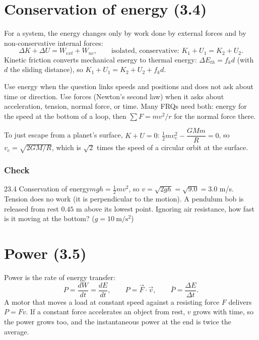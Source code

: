 \documentclass[11pt]{article}
\begin{document}
\section{Conservation of energy (3.4)}\label{sec:3}

For a system, the energy changes only by work done by external forces and by non-conservative internal forces:
\[ \Delta K + \Delta U = W_{ext} + W_{nc}, \qquad \text{isolated, conservative: } K_1 + U_1 = K_2 + U_2. \]
Kinetic friction converts mechanical energy to thermal energy: $\Delta E_{th} = f_k d$ (with $d$ the sliding distance), so $K_1 + U_1 = K_2 + U_2 + f_k d$.

\begin{keyidea}
Use energy when the question links speeds and positions and does not ask about time or direction. Use forces (Newton's second law) when it asks about acceleration, tension, normal force, or time. Many FRQs need both: energy for the speed at the bottom of a loop, then $\sum F = mv^2/r$ for the normal force there.
\end{keyidea}

\begin{example}
To just escape from a planet's surface, $K + U = 0$: $\tfrac12 mv_e^2 - \dfrac{GMm}{R} = 0$, so $v_e = \sqrt{2GM/R}$, which is $\sqrt2$ times the speed of a circular orbit at the surface.
\end{example}

\subsubsection{Check}\mbox{}

\begin{q}{2}{3.4 Conservation of energy}{$mgh = \tfrac12 mv^2$, so $v = \sqrt{2gh} = \sqrt{9.0} = 3.0$ m/s. Tension does no work (it is perpendicular to the motion).}
A pendulum bob is released from rest $0.45$ m above its lowest point. Ignoring air resistance, how fast is it moving at the bottom? ($g = 10\ \mathrm{m/s^2}$)
\end{q}

\section{Power (3.5)}\label{sec:4}

Power is the rate of energy transfer:
\[ P = \frac{dW}{dt} = \frac{dE}{dt}, \qquad P = \vec F\cdot\vec v, \qquad \bar P = \frac{\Delta E}{\Delta t}. \]
A motor that moves a load at constant speed against a resisting force $F$ delivers $P = Fv$. If a constant force accelerates an object from rest, $v$ grows with time, so the power grows too, and the instantaneous power at the end is twice the average.
\end{document}
